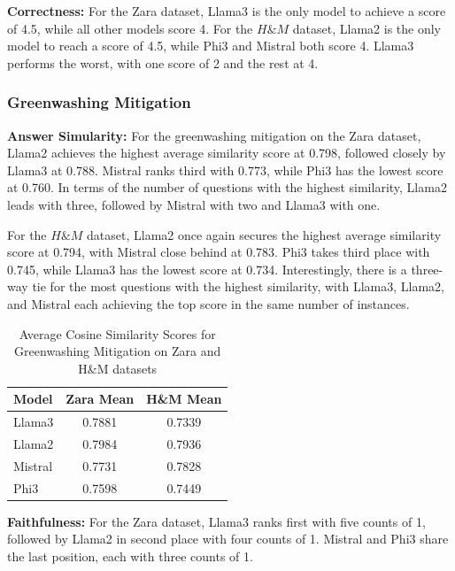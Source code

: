 \documentclass[]{article}
\begin{document}
\textbf{Correctness:}
For the Zara dataset, Llama3 is the only model to achieve a score of 4.5, while all other models score 4.  
For the $H\&M$ dataset, Llama2 is the only model to reach a score of 4.5, while Phi3 and Mistral both score 4. Llama3 performs the worst, with one score of 2 and the rest at 4.

\subsubsection{Greenwashing Mitigation}
\textbf{Answer Simularity:} 
For the greenwashing mitigation on the Zara dataset, Llama2 achieves the highest average similarity score at 0.798, followed closely by Llama3 at 0.788. 
Mistral ranks third with 0.773, while Phi3 has the lowest score at 0.760. In terms of the number of questions with the highest similarity, Llama2 leads with three, followed by Mistral with two and Llama3 with one.

For the $H\&M$ dataset, Llama2 once again secures the highest average similarity score at 0.794, with Mistral close behind at 0.783. Phi3 takes third place with 0.745, while Llama3 has the lowest score at 0.734. 
Interestingly, there is a three-way tie for the most questions with the highest similarity, with Llama3, Llama2, and Mistral each achieving the top score in the same number of instances.

\begin{table}[H]
    \centering
    \begin{tabular}{lcc}
        \toprule
        \textbf{Model} & \textbf{Zara Mean} & \textbf{H\&M Mean} \\
        \midrule
        Llama3  & 0.7881 & 0.7339 \\
        Llama2  & 0.7984 & 0.7936 \\
        Mistral & 0.7731 & 0.7828 \\
        Phi3    & 0.7598 & 0.7449 \\
        \bottomrule
    \end{tabular}
    \caption{Average Cosine Similarity Scores for Greenwashing Mitigation on Zara and H\&M datasets}
    \label{tab:greenwashing_mitigation}
\end{table}

\textbf{Faithfulness:}
For the Zara dataset, Llama3 ranks first with five counts of 1, followed by Llama2 in second place with four counts of 1. Mistral and Phi3 share the last position, each with three counts of 1.  
\end{document}
